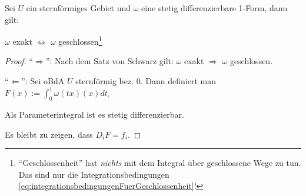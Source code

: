 \begin{theorem}[Pointcar\'e]
	Sei $U$ ein sternf\"ormiges Gebiet und $\omega$ eine stetig differenzierbare 1-Form, dann gilt:
	
	$\omega$ exakt $\Leftrightarrow$ $\omega$ geschlossen\footnote{``Geschlossenheit'' hat \textit{nichts} mit dem Integral \"uber geschlossene Wege zu tun. Das sind nur die Integrationsbedingungen \eqref{eq:integrationsbedingungenFuerGeschlossenheit}!}
\end{theorem}
\begin{proof}
	``$\Rightarrow$'': Nach dem Satz von Schwarz gilt: $\omega$ exakt $\Rightarrow$ $\omega$ geschlossen.
	
	``$\Leftarrow$'': Sei oBdA $U$ sternf\"ormig bez. $0$. Dann definiert man $F(x) := \int_0^1 \omega(tx)(x)dt$.
	
	Als Parameterintegral ist es stetig differenzierbar.
	
	Es bleibt zu zeigen, dass $D_i F = f_i$. 
	
\end{proof}












